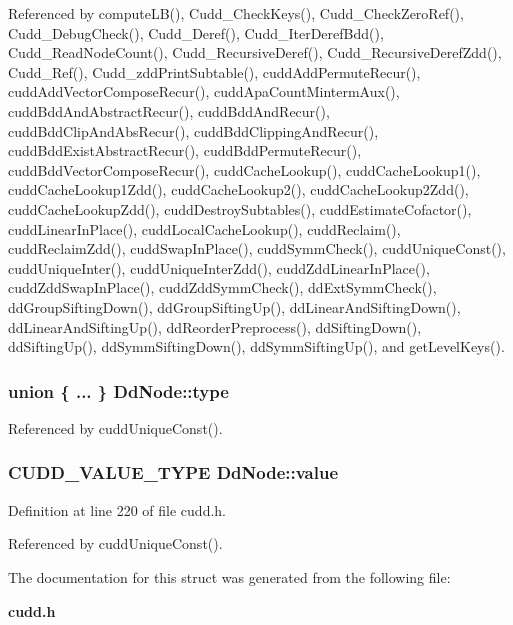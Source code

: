 Referenced by compute\-LB(), Cudd\_\-Check\-Keys(), Cudd\_\-Check\-Zero\-Ref(), Cudd\_\-Debug\-Check(), Cudd\_\-Deref(), Cudd\_\-Iter\-Deref\-Bdd(), Cudd\_\-Read\-Node\-Count(), Cudd\_\-Recursive\-Deref(), Cudd\_\-Recursive\-Deref\-Zdd(), Cudd\_\-Ref(), Cudd\_\-zdd\-Print\-Subtable(), cudd\-Add\-Permute\-Recur(), cudd\-Add\-Vector\-Compose\-Recur(), cudd\-Apa\-Count\-Minterm\-Aux(), cudd\-Bdd\-And\-Abstract\-Recur(), cudd\-Bdd\-And\-Recur(), cudd\-Bdd\-Clip\-And\-Abs\-Recur(), cudd\-Bdd\-Clipping\-And\-Recur(), cudd\-Bdd\-Exist\-Abstract\-Recur(), cudd\-Bdd\-Permute\-Recur(), cudd\-Bdd\-Vector\-Compose\-Recur(), cudd\-Cache\-Lookup(), cudd\-Cache\-Lookup1(), cudd\-Cache\-Lookup1Zdd(), cudd\-Cache\-Lookup2(), cudd\-Cache\-Lookup2Zdd(), cudd\-Cache\-Lookup\-Zdd(), cudd\-Destroy\-Subtables(), cudd\-Estimate\-Cofactor(), cudd\-Linear\-In\-Place(), cudd\-Local\-Cache\-Lookup(), cudd\-Reclaim(), cudd\-Reclaim\-Zdd(), cudd\-Swap\-In\-Place(), cudd\-Symm\-Check(), cudd\-Unique\-Const(), cudd\-Unique\-Inter(), cudd\-Unique\-Inter\-Zdd(), cudd\-Zdd\-Linear\-In\-Place(), cudd\-Zdd\-Swap\-In\-Place(), cudd\-Zdd\-Symm\-Check(), dd\-Ext\-Symm\-Check(), dd\-Group\-Sifting\-Down(), dd\-Group\-Sifting\-Up(), dd\-Linear\-And\-Sifting\-Down(), dd\-Linear\-And\-Sifting\-Up(), dd\-Reorder\-Preprocess(), dd\-Sifting\-Down(), dd\-Sifting\-Up(), dd\-Symm\-Sifting\-Down(), dd\-Symm\-Sifting\-Up(), and get\-Level\-Keys().
\subsubsection{\setlength{\rightskip}{0pt plus 5cm}union \{ ... \}   \bf{Dd\-Node::type}}\label{structDdNode_c7e82d45498ac66d16e74db9a7971d9b}




Referenced by cudd\-Unique\-Const().
\subsubsection{\setlength{\rightskip}{0pt plus 5cm}CUDD\_\-VALUE\_\-TYPE \bf{Dd\-Node::value}}\label{structDdNode_4daed26b440c68f410d46eb180a55abb}




Definition at line 220 of file cudd.h.

Referenced by cudd\-Unique\-Const().

The documentation for this struct was generated from the following file:\begin{CompactItemize}
\item 
\bf{cudd.h}\end{CompactItemize}
